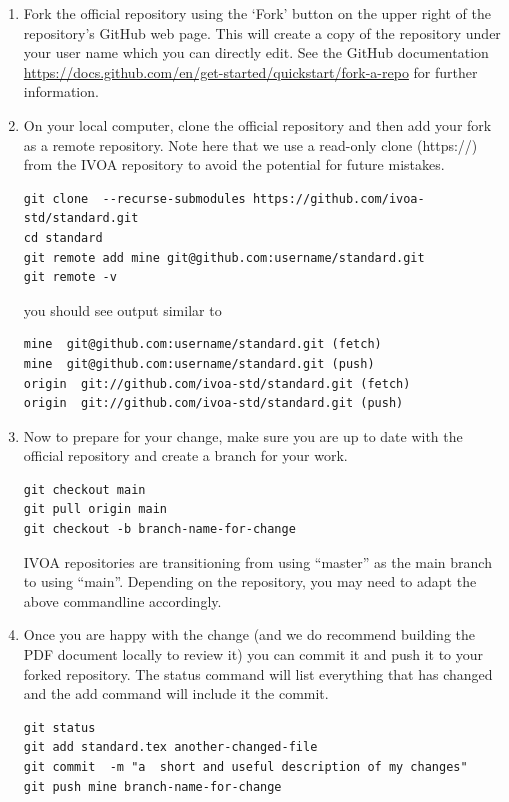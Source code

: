 \documentclass[11pt,a4paper]{ivoa}
\begin{document}
\begin{enumerate}

\item Fork the official repository using the `Fork' button on the upper
right of the repository's GitHub web page. This will create a copy of
the repository under your user name which you can directly edit. See the
GitHub documentation
\url{https://docs.github.com/en/get-started/quickstart/fork-a-repo} for
further information.

\item On your local computer, clone the official repository and
then add your fork as a remote repository. Note here that we use a
read-only clone (https://) from the IVOA repository to avoid the potential
for future mistakes.
\begin{lstlisting}[basicstyle=\footnotesize]
git clone  --recurse-submodules https://github.com/ivoa-std/standard.git
cd standard
git remote add mine git@github.com:username/standard.git
git remote -v
\end{lstlisting}

you should see output similar to
\begin{lstlisting}[basicstyle=\footnotesize]
mine  git@github.com:username/standard.git (fetch)
mine  git@github.com:username/standard.git (push)
origin  git://github.com/ivoa-std/standard.git (fetch)
origin  git://github.com/ivoa-std/standard.git (push)
\end{lstlisting}


\item Now to prepare for your change, make sure you are up to date with
the official repository and create a branch for your work.
\begin{lstlisting}
git checkout main
git pull origin main
git checkout -b branch-name-for-change
\end{lstlisting}

IVOA repositories are transitioning from using ``master'' as the main
branch to using ``main''.  Depending on the repository, you may need to
adapt the above commandline accordingly.

\item Once you are happy with the change (and we do recommend building
the PDF document locally to review it) you can commit it and push
it to your forked repository.  The status command will list everything
that has changed and the add command will include it the commit.

\begin{lstlisting}
git status
git add standard.tex another-changed-file
git commit  -m "a  short and useful description of my changes"
git push mine branch-name-for-change
\end{lstlisting}


\end{enumerate}
\end{document}
